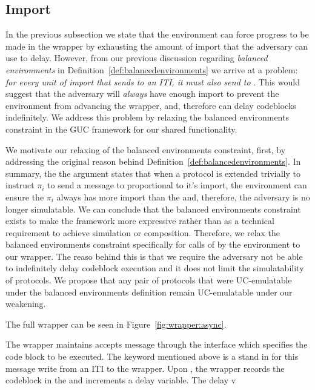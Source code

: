 \subsection{Import}
In the previous subsection we state that the environment can force progress to be made in the wrapper by exhausting the amount of import that the adversary can use to delay.
However, from our previous discussion regarding \textit{balanced environments} in Definition~\ref{def:balancedenvironments} we arrive at a problem: \textit{for every unit of import that \Environment sends to an ITI, it must also send to \Adversary}.
This would suggest that the adversary will \textit{always} have enough import to prevent the environment from advancing the wrapper, and, therefore \Adversary can delay codeblocks indefinitely.
We address this problem by relaxing the balanced environments constraint in the GUC framework for our shared functionality.

We motivate our relaxing of the balanced environments constraint, first, by addressing the original reason behind Definition~\ref{def:balancedenvironments}.
In summary, the the argument states that when a protocol is extended trivially to instruct $\pi_i$ to send a message to \Adversary proportional to it's import, the environment can ensure the $\pi_i$ always has more import than the \Adversary and, therefore, the adversary is no longer simulatable. 
We can conclude that the balanced environments constraint exists to make the framework more expressive rather than as a technical requirement to achieve simulation or composition. 
Therefore, we relax the balanced environments constraint specifically for calls of \Advance by the environment to our wrapper.
The reaso behind this is that we require the adversary not be able to indefinitely delay codeblock execution and it does not limit the simulatability of protocols.
We propose that any pair of protocols that were UC-emulatable under the balanced environments definition remain UC-emulatable under our weakening.




The full wrapper can be seen in Figure~\ref{fig:wrapper:async}.

The wrapper maintains accepts message through the  interface which specifies the code block to be executed.
The \Eventually keyword mentioned above is a stand in for this message write from an ITI to the wrapper.
Upon , the wrapper records the codeblock in the  and increments a delay variable.
The delay v


